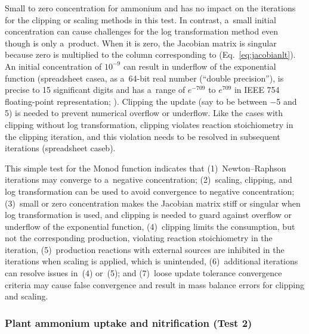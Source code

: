 \documentclass[gmdd, online, hvmath]{copernicus}
\begin{document}
      Small to zero concentration for ammonium and  has no
      impact on the iterations for the clipping or scaling methods in this
      test. In contrast, a~small initial  concentration can
      cause challenges for the log transformation method even though
       is only a~product. When it is zero, the Jacobian matrix
      is singular because zero is multiplied to the column corresponding to
       (Eq.~\ref{eq:jacobianlt}). An initial 
      concentration of $10^{-9}$ can result in underflow of the exponential
      function (spreadsheet casea, as a~64-bit real number (``double
      precision''), is precise to 15 significant digits and has a~range of
      $e^{-709}$ to $e^{709}$ in IEEE 754 floating-point representation;
      \citealp{Lemmon2005}).  Clipping the update (say to be between $-$5 and
      5) is needed to prevent numerical overflow or underflow. Like the
      cases with clipping without log transformation, clipping violates
      reaction stoichiometry in the clipping iteration, and this violation
      needs to be resolved in subsequent iterations (spreadsheet caseb).

      This simple test for the Monod function indicates that
      (1)~Newton--Raphson iterations may converge to a~negative
      concentration; (2)~scaling, clipping, and log transformation can be
      used to avoid convergence to negative concentration; (3)~small or zero
      concentration makes the Jacobian matrix stiff or singular when log
      transformation is used, and clipping is needed to guard against
      overflow or underflow of the exponential function, (4)~clipping limits
      the consumption, but not the corresponding production, violating
      reaction stoichiometry in the iteration, (5)~production reactions with
      external sources are inhibited in the iterations when scaling is
      applied, which is unintended, (6)~additional iterations can resolve
      issues in~(4) or~(5); and (7)~loose update tolerance convergence
      criteria may cause false convergence and result in mass balance errors
      for clipping and scaling.



\subsubsection*{Plant ammonium uptake and nitrification (Test 2)}
\end{document}

